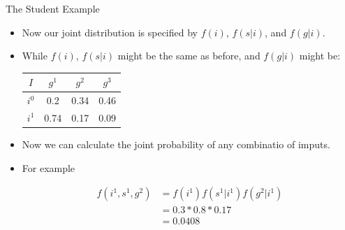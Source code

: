 \documentclass[handout]{beamer}
\begin{document}
\begin{frame}{The Student Example}
\scriptsize{
\begin{itemize}

\item Now our joint distribution is specified by $f(i)$, $f(s|i)$, and $f(g|i)$.

\item While  $f(i)$, $f(s|i)$ might be the same as before, and  $f(g|i)$ might be:


\begin{table}
\centering
  \begin{tabular}{c||ccc} \hline
$I$ & $g^1$ & $g^2$ & $g^3$  \\ \hline
$i^0$ & 0.2 & 0.34 & 0.46 \\
$i^1$ & 0.74 & 0.17 & 0.09 \\

\end{tabular} 
\end{table}

\item Now we can calculate the joint probability of any combinatio of imputs.

\item For example 

 \begin{align}
  f(i^1,s^1,g^2) & = f(i^1)f(s^1|i^1)f(g^2|i^1) \\
   & = 0.3*0.8*0.17 \\
   & = 0.0408
 \end{align}

\end{itemize}



} 

\end{frame}
\end{document}
